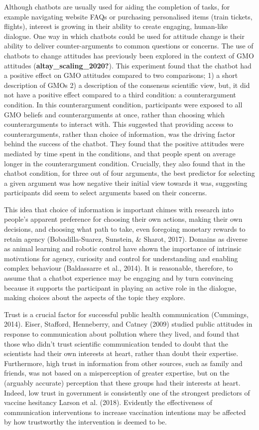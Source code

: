 \documentclass[
  english,
  ,jou,floatsintext]{apa6}
\begin{document}
Although chatbots are usually used for aiding the completion of tasks, for example navigating website FAQs or purchasing personalised items (train tickets, flights), interest is growing in their ability to create engaging, human-like dialogue. One way in which chatbots could be used for attitude change is their ability to deliver counter-arguments to common questions or concerns. The use of chatbots to change attitudes has previously been explored in the context of GMO attitudes (\textbf{altay\_scaling\_2020?}). This experiment found that the chatbot had a positive effect on GMO attitudes compared to two comparisons; 1) a short description of GMOs 2) a description of the consensus scientific view, but, it did not have a positive effect compared to a third condition: a counterargument condition. In this counterargument condition, participants were exposed to all GMO beliefs and counterarguments at once, rather than choosing which counterarguments to interact with. This suggested that providing access to counterarguments, rather than choice of information, was the driving factor behind the success of the chatbot. They found that the positive attitudes were mediated by time spent in the conditions, and that people spent on average longer in the counterargument condition. Crucially, they also found that in the chatbot condition, for three out of four arguments, the best predictor for selecting a given argument was how negative their initial view towards it was, suggesting participants did seem to select arguments based on their concerns.

This idea that choice of information is important chimes with research into people's apparent preference for choosing their own actions, making their own decisions, and choosing what path to take, even foregoing monetary rewards to retain agency (Bobadilla-Suarez, Sunstein, \& Sharot, 2017). Domains as diverse as animal learning and robotic control have shown the importance of intrinsic motivations for agency, curiosity and control for understanding and enabling complex behaviour (Baldassarre et al., 2014). It is reasonable, therefore, to assume that a chatbot experience may be engaging and by turn convincing because it supports the participant in playing an active role in the dialogue, making choices about the aspects of the topic they explore.

Trust is a crucial factor for successful public health communication (Cummings, 2014). Eiser, Stafford, Henneberry, and Catney (2009) studied public attitudes in response to communication about pollution where they lived, and found that those who didn't trust scientific communication tended to doubt that the scientists had their own interests at heart, rather than doubt their expertise. Furthermore, high trust in information from other sources, such as family and friends, was not based on a misperception of greater expertise, but on the (arguably accurate) perception that these groups had their interests at heart. Indeed, low trust in government is consistently one of the strongest predictors of vaccine hesitancy Larson et al. (2018). Evidently the effectiveness of communication interventions to increase vaccination intentions may be affected by how trustworthy the intervention is deemed to be.
\end{document}
